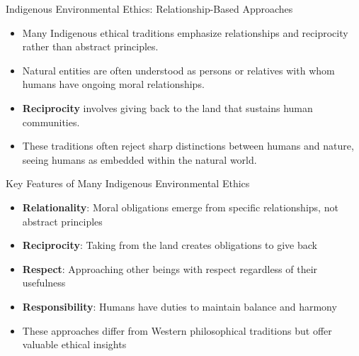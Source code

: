 \documentclass{beamer}
\begin{document}
	\begin{frame}{Indigenous Environmental Ethics: Relationship-Based Approaches}
		\begin{itemize}
			\item Many Indigenous ethical traditions emphasize relationships and reciprocity rather than abstract principles.
			\item Natural entities are often understood as persons or relatives with whom humans have ongoing moral relationships.
			\item \textbf{Reciprocity} involves giving back to the land that sustains human communities.
			\item These traditions often reject sharp distinctions between humans and nature, seeing humans as embedded within the natural world.
		\end{itemize}
		
		\begin{block}{Key Features of Many Indigenous Environmental Ethics}
			\scriptsize
			\begin{itemize}
				\item \textbf{Relationality}: Moral obligations emerge from specific relationships, not abstract principles
				\item \textbf{Reciprocity}: Taking from the land creates obligations to give back
				\item \textbf{Respect}: Approaching other beings with respect regardless of their usefulness
				\item \textbf{Responsibility}: Humans have duties to maintain balance and harmony
				\item These approaches differ from Western philosophical traditions but offer valuable ethical insights
			\end{itemize}
		\end{block}
	\end{frame}
	
\end{document}
